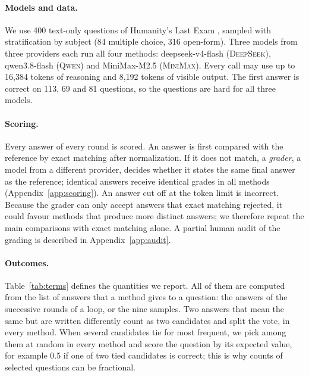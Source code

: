 \documentclass[11pt]{article}
\newcommand{\ds}{\textsc{DeepSeek}}
\newcommand{\qw}{\textsc{Qwen}}
\newcommand{\mm}{\textsc{MiniMax}}
\begin{document}
\paragraph{Models and data.}
We use 400 text-only questions of Humanity's Last Exam \citep{phan2025hle}, sampled with stratification by subject (84 multiple choice, 316 open-form).
Three models from three providers each run all four methods: deepseek-v4-flash (\ds), qwen3.8-flash (\qw) and MiniMax-M2.5 (\mm).
Every call may use up to 16{,}384 tokens of reasoning and 8{,}192 tokens of visible output.
The first answer is correct on 113, 69 and 81 questions, so the questions are hard for all three models.

\paragraph{Scoring.}
Every answer of every round is scored.
An answer is first compared with the reference by exact matching after normalization.
If it does not match, a \emph{grader}, a model from a different provider, decides whether it states the same final answer as the reference; identical answers receive identical grades in all methods (Appendix~\ref{app:scoring}).
An answer cut off at the token limit is incorrect.
Because the grader can only accept answers that exact matching rejected, it could favour methods that produce more distinct answers; we therefore repeat the main comparisons with exact matching alone.
A partial human audit of the grading is described in Appendix~\ref{app:audit}.

\paragraph{Outcomes.}
Table~\ref{tab:terms} defines the quantities we report.
All of them are computed from the list of answers that a method gives to a question: the answers of the successive rounds of a loop, or the nine samples.
Two answers that mean the same but are written differently count as two candidates and split the vote, in every method.
When several candidates tie for most frequent, we pick among them at random in every method and score the question by its expected value, for example 0.5 if one of two tied candidates is correct; this is why counts of selected questions can be fractional.
\end{document}
